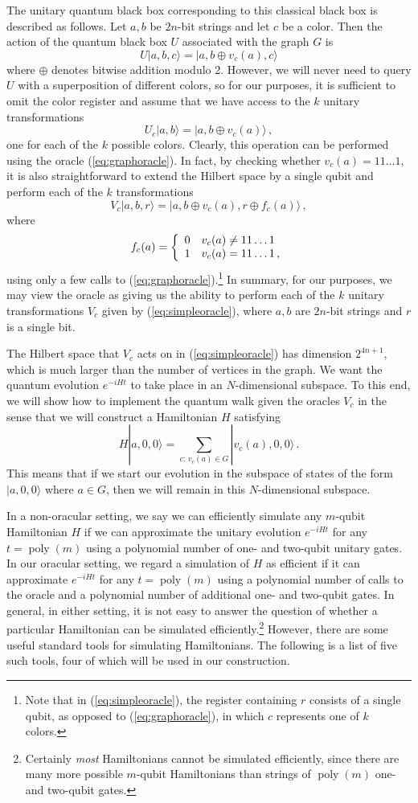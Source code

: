 \documentclass[aps,11pt,twoside,nofootinbib,tightenlines,superscriptaddress,preprintnumbers]{revtex4}
\makeatletter
\newcommand{\<}{\langle}
\renewcommand{\>}{\rangle}
\newcommand{\be}{\begin{equation}}
\newcommand{\ee}{\end{equation}}
\newcommand{\cond}[1]{\left\{\begin{array}{l@{~~~}l}#1\end{array}\right.}
\newcommand{\poly}{\mathop{\mathrm{poly}}\nolimits}
\makeatother
\begin{document}
The unitary quantum black box corresponding to this classical black box is
described as follows.  Let $a,b$ be $2n$-bit strings and let $c$ be a
color.  Then the action of the quantum black box $U$ associated with the
graph $G$ is
\be
  U |a,b,c\> = |a,b \oplus v_c(a),c\>
\label{eq:graphoracle}
\ee
where $\oplus$ denotes bitwise addition modulo 2.  However, we will never
need to query $U$ with a superposition of different colors, so for our
purposes, it is sufficient to omit the color register and assume that we
have access to the $k$ unitary transformations
\be
  U_c|a,b\> = |a,b \oplus v_c(a)\>
\,,
\ee
one for each of the $k$ possible colors.  Clearly, this operation can be
performed using the oracle (\ref{eq:graphoracle}).  In fact, by checking
whether $v_c(a)=11\ldots1$, it is also straightforward to extend the
Hilbert space by a single qubit and perform each of the $k$
transformations
\be
  V_c|a,b,r\> = |a,b \oplus v_c(a),r \oplus f_c(a)\>
\,,
\label{eq:simpleoracle}
\ee
where
\be
  f_c(a) = \cond{
      0 & v_c(a) \ne 11\ldots1 \\
      1 & v_c(a) = 11\ldots1 \,,}
\ee
using only a few calls to (\ref{eq:graphoracle}).\footnote{Note that in
(\ref{eq:simpleoracle}), the register containing $r$ consists of a single
qubit, as opposed to (\ref{eq:graphoracle}), in which $c$ represents one
of $k$ colors.}
%
In summary, for our purposes, we may view the oracle as giving us the
ability to perform each of the $k$ unitary transformations $V_c$ given by
(\ref{eq:simpleoracle}), where $a,b$ are $2n$-bit strings and $r$ is a
single bit.

The Hilbert space that $V_c$ acts on in (\ref{eq:simpleoracle}) has
dimension $2^{4n+1}$, which is much larger than the number of vertices in
the graph.  We want the quantum evolution $e^{-i H t}$ to take place in an
$N$-dimensional subspace.  To this end, we will show how to implement the
quantum walk given the oracles $V_c$ in the sense that we will construct a
Hamiltonian $H$ satisfying
\be
  H |a, 0, 0\> = \sum_{c:\, v_c(a) \in G} |v_c(a),0,0\>
\,.
\label{eq:ham}
\ee
This means that if we start our evolution in the subspace of states of the
form $|a,0,0\>$ where $a \in G$, then we will remain in this
$N$-dimensional subspace.

In a non-oracular setting, we say we can efficiently simulate any
$m$-qubit Hamiltonian $H$ if we can approximate the unitary evolution
$e^{-i H t}$ for any $t=\poly(m)$ using a polynomial number of one- and
two-qubit unitary gates.  In our oracular setting, we regard a simulation
of $H$ as efficient if it can approximate $e^{-i H t}$ for any
$t=\poly(m)$ using a polynomial number of calls to the oracle and a
polynomial number of additional one- and two-qubit gates.  In general, in
either setting, it is not easy to answer the question of whether a
particular Hamiltonian can be simulated efficiently.\footnote{Certainly
{\em most} Hamiltonians cannot be simulated efficiently, since there are
many more possible $m$-qubit Hamiltonians than strings of $\poly(m)$ one-
and two-qubit gates.} However, there are some useful standard tools for
simulating Hamiltonians.  The following is a list of five such tools, four
of which will be used in our construction.
\end{document}
